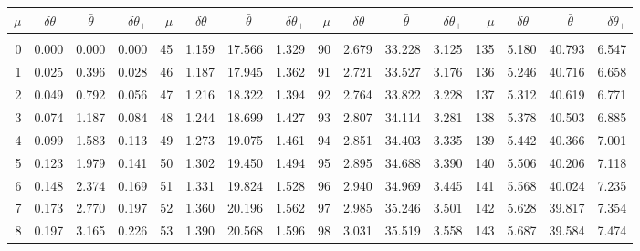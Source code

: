 \clearpage
\begin{table}[!h]\centering
\vspace{0.25cm}
\scriptsize{ \begin{tabular}{rrrr|rrrr|rrrr|rrrr}
$\mu$ & $\delta\theta_-$  & $\bar{\theta}~~~~$ & $\delta\theta_+$ &
$\mu$ & $\delta\theta_-$  & $\bar{\theta}~~~~$ & $\delta\theta_+$ &
$\mu$ & $\delta\theta_-$  & $\bar{\theta}~~~~$ & $\delta\theta_+$ &
$\mu$ & $\delta\theta_-$  & $\bar{\theta}~~~~$ & $\delta\theta_+$ \\\hline
&&&&&&&&&&&&&&&\\[-1.75ex]
    0 & \tiny{  0.000} &   0.000 & \tiny{  0.000} &  45 & \tiny{  1.159} &  17.566 & \tiny{  1.329} &  90 & \tiny{  2.679} &  33.228 & \tiny{  3.125} & 135 & \tiny{  5.180} &  40.793 & \tiny{  6.547}\\
  1 & \tiny{  0.025} &   0.396 & \tiny{  0.028} &  46 & \tiny{  1.187} &  17.945 & \tiny{  1.362} &  91 & \tiny{  2.721} &  33.527 & \tiny{  3.176} & 136 & \tiny{  5.246} &  40.716 & \tiny{  6.658}\\
  2 & \tiny{  0.049} &   0.792 & \tiny{  0.056} &  47 & \tiny{  1.216} &  18.322 & \tiny{  1.394} &  92 & \tiny{  2.764} &  33.822 & \tiny{  3.228} & 137 & \tiny{  5.312} &  40.619 & \tiny{  6.771}\\
  3 & \tiny{  0.074} &   1.187 & \tiny{  0.084} &  48 & \tiny{  1.244} &  18.699 & \tiny{  1.427} &  93 & \tiny{  2.807} &  34.114 & \tiny{  3.281} & 138 & \tiny{  5.378} &  40.503 & \tiny{  6.885}\\
  4 & \tiny{  0.099} &   1.583 & \tiny{  0.113} &  49 & \tiny{  1.273} &  19.075 & \tiny{  1.461} &  94 & \tiny{  2.851} &  34.403 & \tiny{  3.335} & 139 & \tiny{  5.442} &  40.366 & \tiny{  7.001}\\
  5 & \tiny{  0.123} &   1.979 & \tiny{  0.141} &  50 & \tiny{  1.302} &  19.450 & \tiny{  1.494} &  95 & \tiny{  2.895} &  34.688 & \tiny{  3.390} & 140 & \tiny{  5.506} &  40.206 & \tiny{  7.118}\\
  6 & \tiny{  0.148} &   2.374 & \tiny{  0.169} &  51 & \tiny{  1.331} &  19.824 & \tiny{  1.528} &  96 & \tiny{  2.940} &  34.969 & \tiny{  3.445} & 141 & \tiny{  5.568} &  40.024 & \tiny{  7.235}\\
  7 & \tiny{  0.173} &   2.770 & \tiny{  0.197} &  52 & \tiny{  1.360} &  20.196 & \tiny{  1.562} &  97 & \tiny{  2.985} &  35.246 & \tiny{  3.501} & 142 & \tiny{  5.628} &  39.817 & \tiny{  7.354}\\
  8 & \tiny{  0.197} &   3.165 & \tiny{  0.226} &  53 & \tiny{  1.390} &  20.568 & \tiny{  1.596} &  98 & \tiny{  3.031} &  35.519 & \tiny{  3.558} & 143 & \tiny{  5.687} &  39.584 & \tiny{  7.474}\\

\end{tabular}}
\end{table}

